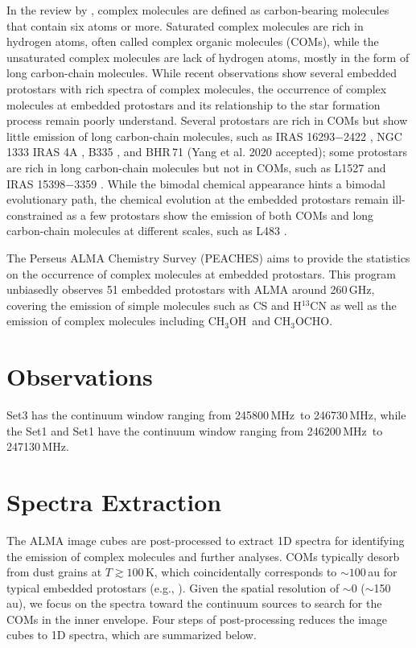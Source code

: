 \documentclass[twocolumn]{aastex62}
\newcommand{\mhz}{\mbox{\,MHz}}
\newcommand{\methylformate}{\mbox{CH$_{3}$OCHO}}
\newcommand{\methanol}{\mbox{CH$_{3}$OH}}
\begin{document}
In the review by \citet{2009ARA&A..47..427H}, complex molecules are defined as carbon-bearing molecules that contain six atoms or more.  Saturated complex molecules are rich in hydrogen atoms, often called complex organic molecules (COMs), while the unsaturated complex molecules are lack of hydrogen atoms, mostly in the form of long carbon-chain molecules.  While recent observations show several embedded protostars with rich spectra of complex molecules, the occurrence of complex molecules at embedded protostars and its relationship to the star formation process remain poorly understand.  Several protostars are rich in COMs but show little emission of long carbon-chain molecules, such as IRAS 16293$-$2422 \citep{2016A&A...595A.117J}, NGC 1333 IRAS 4A \citep{2004ApJ...615..354B}, B335 \citep{2016ApJ...830L..37I,2019ApJ...873L..21I}, and BHR\,71 (Yang et al. 2020 accepted); some protostars are rich in long carbon-chain molecules but not in COMs, such as L1527 \citep{2010ApJ...722.1633S} and IRAS 15398$-$3359 \citep{2009ApJ...697..769S}.  While the bimodal chemical appearance hints a bimodal evolutionary path, the chemical evolution at the embedded protostars remain ill-constrained as a few protostars show the emission of both COMs and long carbon-chain molecules at different scales, such as L483 \citep{2017ApJ...837..174O}. 

The Perseus ALMA Chemistry Survey (PEACHES) aims to provide the statistics on the occurrence of complex molecules at embedded protostars.  This program unbiasedly observes 51 embedded protostars with ALMA around 260\,GHz, covering the emission of simple molecules such as CS and H$^{13}$CN as well as the emission of complex molecules including \methanol\ and \methylformate.  

\section{Observations}
Set3 has the continuum window ranging from 245800\mhz\ to 246730\mhz, while the Set1 and Set1 have the continuum window ranging from 246200\mhz\ to 247130\mhz.





\section{Spectra Extraction}
The ALMA image cubes are post-processed to extract 1D spectra for identifying the emission of complex molecules and further analyses.  COMs typically desorb from dust grains at $T \gtrsim 100$\,K, which coincidentally corresponds to $\sim 100$\,au for typical embedded protostars (e.g., \citealt{2020ApJ...891...61Y}).  Given the spatial resolution of $\sim$0 ($\sim$150\,au), we focus on the spectra toward the continuum sources to search for the COMs in the inner envelope.  Four steps of post-processing reduces the image cubes to 1D spectra, which are summarized below.
\end{document}
